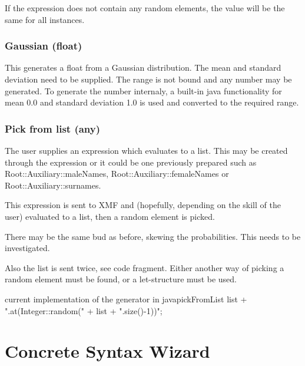 \documentclass [11pt,letterpaper,twoside,openright]{book}
\begin{document}
If the expression does not contain any random elements, the value will be the same for all instances. 

\subsection{Gaussian (float)}
This generates a float from a Gaussian distribution. The mean and standard deviation need to be supplied. The range is not bound and any number may be generated. To generate the number internaly, a built-in java functionality for mean 0.0 and standard deviation 1.0 is used and converted to the required range.

\subsection{Pick from list (any)}
The user supplies an expression which evaluates to a list. This may be created through the expression or it could be one previously prepared such as Root::Auxiliary::maleNames, Root::Auxiliary::femaleNames or Root::Auxiliary::surnames.

This expression is sent to XMF and (hopefully, depending on the skill of the user) evaluated to a list, then a random element is picked. 

There may be the same bud as before, skewing the probabilities. This needs to be investigated. 

Also the list is sent twice, see code fragment. Either another way of picking a random element must be found, or a let-structure must be used.
\begin{lstfloat}
\begin{XOCL}{current implementation of the generator in java}{pickFromList}
list + ".at(Integer::random(" + list + ".size()-1))";
\end{XOCL}
\end{lstfloat}


\chapter{Concrete Syntax Wizard}
\end{document}

